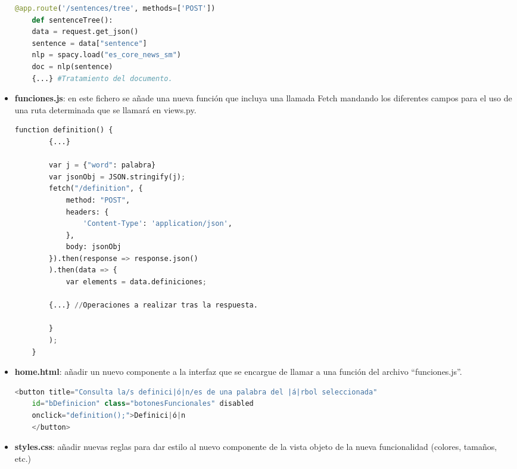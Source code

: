 \begin{itemize}
\begin{lstlisting}[language=python,firstnumber=1]
	@app.route('/sentences/tree', methods=['POST'])
	def sentenceTree():
	data = request.get_json()
	sentence = data["sentence"]
	nlp = spacy.load("es_core_news_sm")
	doc = nlp(sentence)
	{...} #Tratamiento del documento.
\end{lstlisting}

	
	\item \textbf{funciones.js}: en este fichero se añade una nueva función que incluya una llamada Fetch mandando los diferentes campos para el uso de una ruta determinada que se llamará en views.py. 
	
	\begin{lstlisting}[language=python,firstnumber=1]
	function definition() {
		{...}
		
		var j = {"word": palabra}
		var jsonObj = JSON.stringify(j);
		fetch("/definition", {
			method: "POST",
			headers: {
				'Content-Type': 'application/json',
			},
			body: jsonObj
		}).then(response => response.json()
		).then(data => {
			var elements = data.definiciones;
			
		{...} //Operaciones a realizar tras la respuesta.
			
		}
		);		
	}
	\end{lstlisting}
	
	
	
	
	
	\item \textbf{home.html}: añadir un nuevo componente a la interfaz que se encargue de llamar a una función del archivo ``funciones.js''. 
		\begin{lstlisting}[language=python,firstnumber=1]
	<button title="Consulta la/s definici|ó|n/es de una palabra del |á|rbol seleccionada"
	id="bDefinicion" class="botonesFuncionales" disabled
	onclick="definition();">Definici|ó|n
	</button>
	\end{lstlisting}
	\item \textbf{styles.css}: añadir nuevas reglas para dar estilo al nuevo componente de la vista objeto de la nueva funcionalidad (colores, tamaños, etc.)
\end{itemize}
